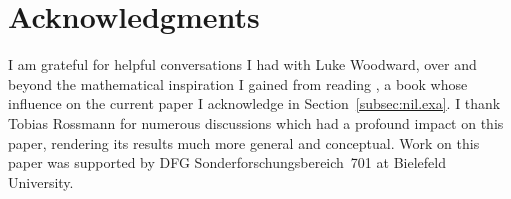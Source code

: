 \documentclass[11pt]{amsart}
\numberwithin{equation}{section}
\numberwithin{figure}{section}
\theoremstyle{plain}
\theoremstyle{definition}
\theoremstyle{remark}
\begin{document}
\section*{Acknowledgments} 
I am grateful for helpful conversations I had with Luke Woodward, over
and beyond the mathematical inspiration I gained from reading
\cite{duSWoodward/08}, a book whose influence on the current paper I
acknowledge in Section~\ref{subsec:nil.exa}. I thank Tobias Rossmann
for numerous discussions which had a profound impact on this paper,
rendering its results much more general and conceptual. Work on this
paper was supported by DFG Sonderforschungsbereich~701 at Bielefeld
University.

 
\providecommand{\bysame}{\leavevmode\hbox to3em{\hrulefill}\thinspace}
\providecommand{\MR}{\relax\ifhmode\unskip\space\fi MR }
\providecommand{\MRhref}[2]{  \href{http://www.ams.org/mathscinet-getitem?mr=#1}{#2}
}
\providecommand{\href}[2]{#2}
\end{document}
